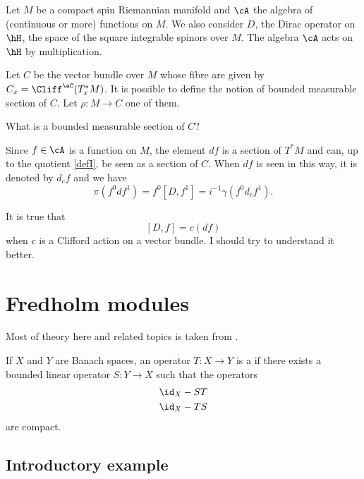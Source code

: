 Let $M$ be a compact spin Riemannian manifold and $\cA$ the algebra of (continuous or more) functions on $M$. We also consider $D$, the Dirac operator on $\hH$, the space of the square integrable spinors over $M$. The algebra $\cA$ acts on $\hH$ by multiplication.

Let $C$ be the vector bundle over $M$ whose fibre are given by $C_x=\Cliff^{\eC}(T^*_xM)$. It is possible to define the notion of bounded measurable section of $C$. Let $\rho\colon M\to C$ one of them.

\begin{probleme}
	What is a bounded measurable section of $C$?
\end{probleme}

Since $f\in\cA$ is a function on $M$, the element $df$ is a section of $T^*M$ and can, up to the quotient \eqref{defI}, be seen as a section of $C$. When $df$ is seen in this way, it is denoted by $d_cf$ and we have
\[ 
  \pi(f^0df^1)=f^0[D,f^1]=i^{-1}\gamma(f^0d_cf^1).
\]

\begin{probleme}
It is true that
\[ 
  [D,f]=c(df)
\]
when $c$ is a Clifford action on a vector bundle. I should try to understand it better.
\end{probleme}


\section{Fredholm modules}

Most of theory here and related topics is taken from \cite{ConnesNCG,Landi}.

If $X$ and $Y$ are Banach spaces, an operator $T\colon X\to Y$ is a  if there exists a bounded linear operator $S\colon Y\to X$ such that the operators
\begin{subequations}
	\begin{align}
		\id_X-ST\\
		\id_X-TS
	\end{align}
\end{subequations}
are compact.

\subsection{Introductory example}


